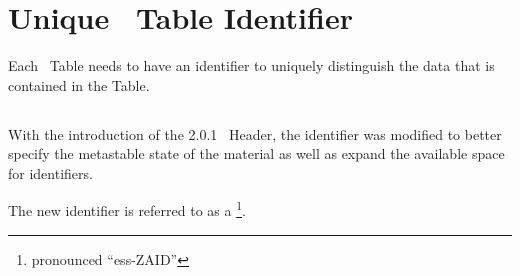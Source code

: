 \section{Unique \ACE\ Table Identifier}\label{sec:UniqueIdentifier}
Each \ACE\ Table needs to have an identifier to uniquely distinguish the data that is contained in the Table.
\subsection{\ZAID}\label{sec:ZAID}

\subsection{\SZAID}\label{sec:SZAID}
With the introduction of the 2.0.1 \ACE\ Header, the identifier was modified to better specify the metastable state of the material as well as expand the available space for identifiers. 

The new identifier is referred to as a \SZAID\footnote{pronounced ``ess-ZAID''}.

